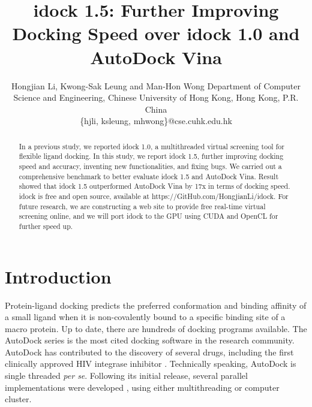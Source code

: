 \documentclass[10pt,conference,compsocconf]{../IEEEtran}
\begin{document}
\title{idock 1.5: Further Improving Docking Speed over idock 1.0 and AutoDock Vina}
\author
{
\IEEEauthorblockN
{
Hongjian Li, Kwong-Sak Leung and Man-Hon Wong
\IEEEauthorblockA
{
Department of Computer Science and Engineering, Chinese University of Hong Kong, Hong Kong, P.R. China\\
\{hjli, ksleung, mhwong\}@cse.cuhk.edu.hk
}
}
}
\maketitle

\begin{abstract}

In a previous study, we reported idock 1.0, a multithreaded virtual screening tool for flexible ligand docking. In this study, we report idock 1.5, further improving docking speed and accuracy, inventing new functionalities, and fixing bugs. We carried out a comprehensive benchmark to better evaluate idock 1.5 and AutoDock Vina. Result showed that idock 1.5 outperformed AutoDock Vina by 17x in terms of docking speed. idock is free and open source, available at https://GitHub.com/HongjianLi/idock. For future research, we are constructing a web site to provide free real-time virtual screening online, and we will port idock to the GPU using CUDA and OpenCL for further speed up.

\end{abstract}

\section{Introduction}

Protein-ligand docking predicts the preferred conformation and binding affinity of a small ligand when it is non-covalently bound to a specific binding site of a macro protein. Up to date, there are hundreds of docking programs available. The AutoDock series is the most cited docking software in the research community. AutoDock has contributed to the discovery of several drugs, including the first clinically approved HIV integrase inhibitor \citep{1169}. Technically speaking, AutoDock is single threaded \textit{per se}. Following its initial release, several parallel implementations were developed \citep{115,560,782}, using either multithreading or computer cluster.
\end{document}

